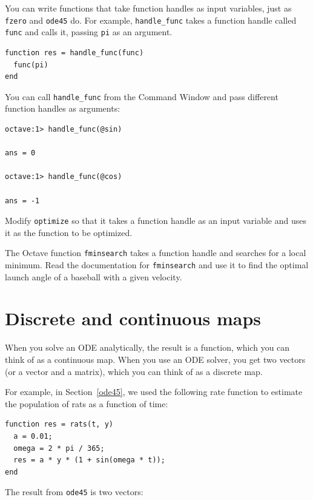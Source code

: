 \documentclass{book}
\begin{document}
\begin{ex}
You can write functions that take function handles as input
variables, just as {\tt fzero} and {\tt ode45} do.
For example, {\tt handle\_func} takes a function handle called
{\tt func} and calls it, passing {\tt pi} as an argument.

\begin{verbatim}
function res = handle_func(func)
  func(pi)
end
\end{verbatim}

You can call {\tt handle\_func} from the Command Window and pass
different function handles as arguments:

\begin{verbatim}
octave:1> handle_func(@sin)

ans = 0

octave:1> handle_func(@cos)

ans = -1
\end{verbatim}

Modify {\tt optimize} so that it takes a function handle
as an input variable and uses it as the function to be
optimized.
\end{ex}

\begin{ex}
The Octave function {\tt fminsearch} takes a function handle
and searches for a local minimum. Read the documentation for
{\tt fminsearch} and use it to find the optimal launch angle
of a baseball with a given velocity.
\end{ex}


\section{Discrete and continuous maps}

When you solve an ODE analytically, the result is a function,
which you can think of as a continuous map. When you use an
ODE solver, you get two vectors (or a vector and a matrix), which
you can think of as a discrete map.

For example, in Section~\ref{ode45}, we used the following rate
function to estimate the population of rats as a function of time:

\begin{verbatim}
function res = rats(t, y)
  a = 0.01;
  omega = 2 * pi / 365;
  res = a * y * (1 + sin(omega * t));
end
\end{verbatim}

The result from {\tt ode45} is two vectors:
\end{document}
